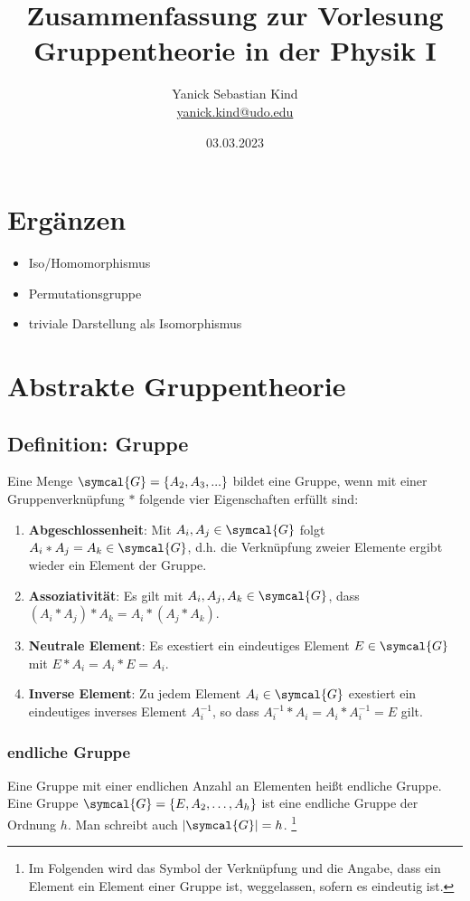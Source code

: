 \documentclass[
  captions=tableheading,  %
  titlepage=firstiscover, %
]{scrartcl}
\author{%
  Yanick Sebastian Kind\\%
  \href{mailto:yanick.kind@udo.edu}{yanick.kind@udo.edu}%
}
\title{Zusammenfassung zur Vorlesung Gruppentheorie in der Physik I}
\date{03.03.2023}
\begin{document}
\maketitle

\tableofcontents

\theoremstyle{remark}
\newtheorem{df}{Definition}
\listoftheorems


\newpage
\section{Ergänzen}
\begin{itemize}
  \item Iso/Homomorphismus
  \item Permutationsgruppe
  \item triviale Darstellung als Isomorphismus
\end{itemize}
\section{Abstrakte Gruppentheorie}
\subsection{Definition: Gruppe}
  Eine Menge $\symcal{G} = \{A_2,A_3,...\}$ bildet eine Gruppe, wenn mit einer Gruppenverknüpfung $*$ folgende vier Eigenschaften erfüllt sind:
  \begin{enumerate}
    \item \textbf{Abgeschlossenheit}: Mit $A_i, A_j \in \symcal{G}$ folgt $A_i * A_j = A_k \in \symcal{G}$, d.h. die Verknüpfung zweier 
    Elemente ergibt wieder ein Element der Gruppe.
    \item \textbf{Assoziativität}: Es gilt mit $A_i, A_j, A_k \in \symcal{G}$, dass $(A_i * A_j) * A_k = A_i * (A_j*A_k)$.
    \item \textbf{Neutrale Element}: Es exestiert ein eindeutiges Element $E\in \symcal{G}$ mit $E * A_i = A_i * E  = A_i$.
    \item \textbf{Inverse Element}: Zu jedem Element $A_i \in \symcal{G}$ exestiert ein eindeutiges inverses Element $A_i^{-1}$,
      so dass $A_i^{-1} * A_i = A_i * A_i^{-1} = E$ gilt.
  \end{enumerate}
\subsubsection{endliche Gruppe}
Eine Gruppe mit einer endlichen Anzahl an Elementen heißt endliche Gruppe.
Eine Gruppe $\symcal{G} = \{ E, A_2, \ldots, A_h \} $ ist eine endliche Gruppe der Ordnung $h$.
Man schreibt auch $|\symcal{G}| = h$.
\footnote{Im Folgenden wird das Symbol der Verknüpfung und die Angabe, dass ein Element ein Element
einer Gruppe ist, weggelassen, sofern es eindeutig ist.}
\end{document}
